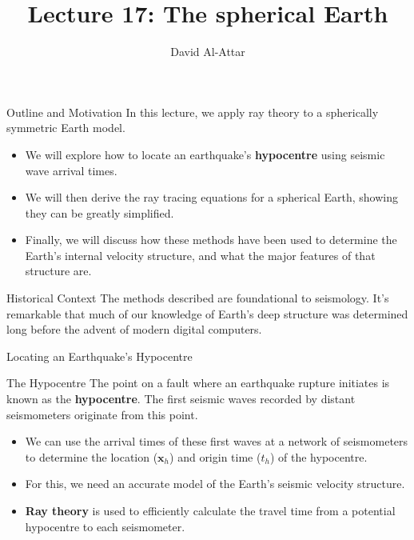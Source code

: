 \documentclass{beamer}
\title[Lecture 17: The spherical Earth]{Lecture 17: The spherical Earth}
\author{David Al-Attar}
\institute{Michaelmas term 2024}
\date{}
\begin{document}

\begin{frame}
    \titlepage
\end{frame}

\begin{frame}{Outline and Motivation}
    In this lecture, we apply ray theory to a spherically symmetric Earth model.
    \begin{itemize}
        \item We will explore how to locate an earthquake's \textbf{hypocentre} using seismic wave arrival times.
        \pause
        \item We will then derive the ray tracing equations for a spherical Earth, showing they can be greatly simplified.
        \pause
        \item Finally, we will discuss how these methods have been used to determine the Earth's internal velocity structure, and what the major features of that structure are.
    \end{itemize}
    \pause
    \begin{exampleblock}{Historical Context}
        The methods described are foundational to seismology. It's remarkable that much of our knowledge of Earth's deep structure was determined long before the advent of modern digital computers.
    \end{exampleblock}
\end{frame}


\begin{frame}{Locating an Earthquake's Hypocentre}
    \begin{block}{The Hypocentre}
        The point on a fault where an earthquake rupture initiates is known as the \textbf{hypocentre}. The first seismic waves recorded by distant seismometers originate from this point.
    \end{block}
    \pause
    \begin{itemize}
        \item We can use the arrival times of these first waves at a network of seismometers to determine the location ($ \mathbf{x}_h $) and origin time ($ t_h $) of the hypocentre.
        \pause
        \item For this, we need an accurate model of the Earth's seismic velocity structure.
        \pause
        \item \textbf{Ray theory} is used to efficiently calculate the travel time from a potential hypocentre to each seismometer.
    \end{itemize}
\end{frame}
\end{document}
